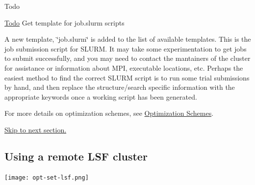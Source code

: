 \begin{DoxyRefDesc}{Todo}
\item[\hyperlink{todo__todo000003}{Todo}]Get template for job.\+slurm scripts\end{DoxyRefDesc}


A new template, \char`\"{}job.\+slurm\char`\"{} is added to the list of available templates. This is the job submission script for S\+L\+U\+R\+M. It may take some experimentation to get jobs to submit successfully, and you may need to contact the mantainers of the cluster for assistance or information about M\+P\+I, executable locations, etc. Perhaps the easiest method to find the correct S\+L\+U\+R\+M script is to run some trial submissions by hand, and then replace the structure/search specific information with the appropriate keywords once a working script has been generated.

For more details on optimization schemes, see \hyperlink{optschemes}{Optimization Schemes}.

\hyperlink{tut-xo_files}{Skip to next section.}\hypertarget{tut-xo_remotelsf}{}\subsection{Using a remote L\+S\+F cluster}\label{tut-xo_remotelsf}
 
\begin{DoxyImageNoCaption}
  \mbox{\texttt{[image: opt-set-lsf.png]}}
\end{DoxyImageNoCaption}


